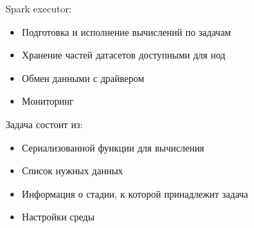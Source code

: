 Spark executor:
\begin{itemize}
    \item Подготовка и исполнение вычислений по задачам
    \item Хранение частей датасетов доступными для нод
    \item Обмен данными с драйвером
    \item Мониторинг
\end{itemize}

Задача состоит из:
\begin{itemize}
    \item Сериализованной функции для вычисления
    \item Список нужных данных
    \item Информация о стадии, к которой принадлежит задача
    \item Настройки среды
\end{itemize}

